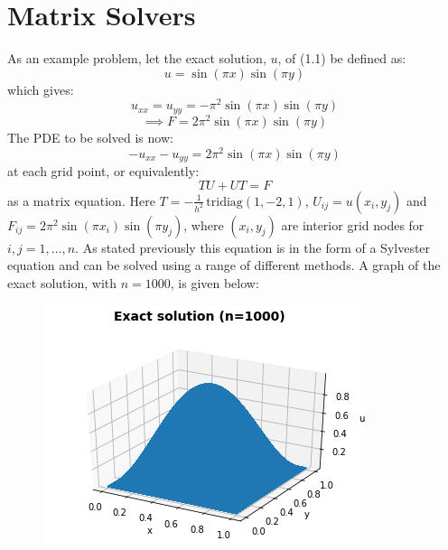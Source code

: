 \documentclass{article}
\numberwithin{equation}{section}
\begin{document}
\section{Matrix Solvers}
As an example problem, let the exact solution, $u$, of (1.1) be defined as:
\begin{equation} 
u = \sin{(\pi x)} \sin{(\pi y)}
\end{equation}
which gives:
\begin{equation} 
u_{xx} = u_{yy} = - \pi^2 \sin{(\pi x)} \sin{(\pi y)}
\end{equation}
\begin{equation}
\implies F = 2 \pi^2 \sin{(\pi x)} \sin {(\pi y)}
\end{equation}
The PDE to be solved is now:
\begin{equation}
-u_{xx} - u_{yy}  = 2 \pi^2 \sin{(\pi x)} \sin {(\pi y)}
\end{equation}
at each grid point, or equivalently:
	\begin{equation}
	TU + UT = F
	\end{equation}
as a matrix equation. Here $T=-\frac{1}{h^2} \, \text{tridiag}(1,-2,1)$, $U_{ij} = u(x_i, y_j)$ and $F_{ij} = 2 \pi^2 \sin{(\pi x_i)} \sin{(\pi y_j)}$, where $(x_i, y_j)$ are interior grid nodes for $i,j=1,\dots,n$. As stated previously this equation is in the form of a Sylvester equation and can be solved using a range of different methods. A graph of the exact solution, with $n=1000$, is given below:

\begin{figure}[H]
\includegraphics[scale=.7]{img/U_sol.png}
\centering
\end{figure} 
\end{document}
